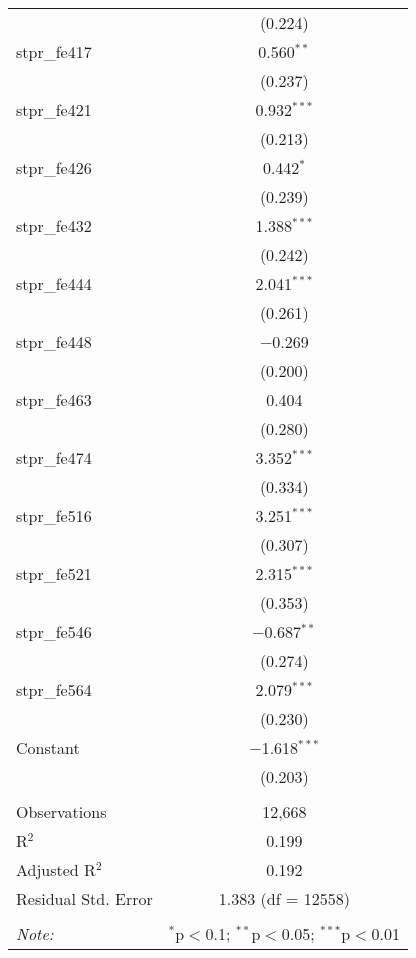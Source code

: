 \begin{table}[!htbp]
\begin{tabular}{@{\extracolsep{5pt}}lc}
  & (0.224) \\ 
  stpr\_fe417 & 0.560$^{**}$ \\ 
  & (0.237) \\ 
  stpr\_fe421 & 0.932$^{***}$ \\ 
  & (0.213) \\ 
  stpr\_fe426 & 0.442$^{*}$ \\ 
  & (0.239) \\ 
  stpr\_fe432 & 1.388$^{***}$ \\ 
  & (0.242) \\ 
  stpr\_fe444 & 2.041$^{***}$ \\ 
  & (0.261) \\ 
  stpr\_fe448 & $-$0.269 \\ 
  & (0.200) \\ 
  stpr\_fe463 & 0.404 \\ 
  & (0.280) \\ 
  stpr\_fe474 & 3.352$^{***}$ \\ 
  & (0.334) \\ 
  stpr\_fe516 & 3.251$^{***}$ \\ 
  & (0.307) \\ 
  stpr\_fe521 & 2.315$^{***}$ \\ 
  & (0.353) \\ 
  stpr\_fe546 & $-$0.687$^{**}$ \\ 
  & (0.274) \\ 
  stpr\_fe564 & 2.079$^{***}$ \\ 
  & (0.230) \\ 
  Constant & $-$1.618$^{***}$ \\ 
  & (0.203) \\ 
 \hline \\[-1.8ex] 
Observations & 12,668 \\ 
R$^{2}$ & 0.199 \\ 
Adjusted R$^{2}$ & 0.192 \\ 
Residual Std. Error & 1.383 (df = 12558) \\ 
\hline 
\hline \\[-1.8ex] 
\textit{Note:}  & \multicolumn{1}{r}{$^{*}$p$<$0.1; $^{**}$p$<$0.05; $^{***}$p$<$0.01} \\ 
\end{tabular} 
\end{table} 
